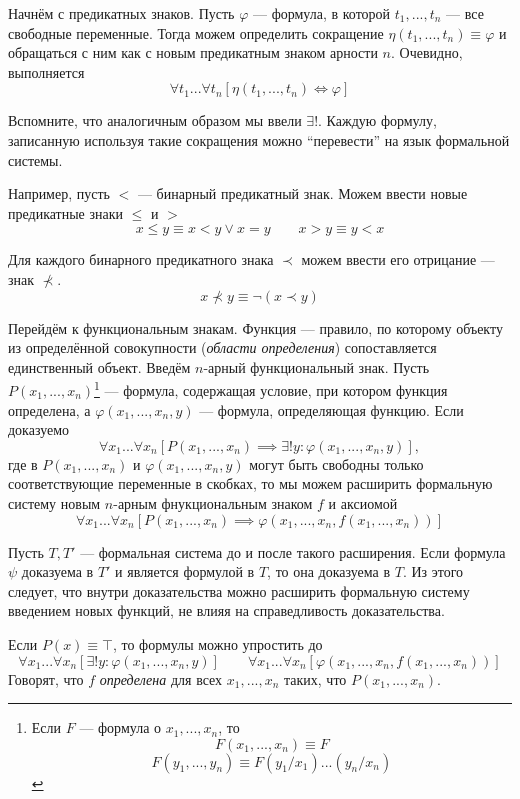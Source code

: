 Начнём с предикатных знаков. Пусть $\varphi$ --- формула,
в которой $t_1,...,t_{n}$ --- все
свободные переменные. Тогда можем определить сокращение $\eta(t_1,...,t_{n})\equiv\varphi$
и обращаться с ним как с новым предикатным знаком арности $n$.
Очевидно, выполняется
\[
	\forall t_1...\forall t_{n}[\eta(t_1,...,t_{n})\iff\varphi]
\]

Вспомните, что аналогичным образом мы ввели $\exists!$. Каждую формулу,
записанную используя такие сокращения можно
``перевести'' на язык формальной системы.

Например, пусть $<$ --- бинарный предикатный знак.
Можем ввести новые предикатные знаки $\leq$ и $>$
\[
	x\leq y\equiv x<y\lor x=y\qquad x>y\equiv y< x
\]

Для каждого бинарного предикатного знака $\prec$ можем
ввести его отрицание --- знак $\nprec$.
\[
	x\nprec y\equiv \lnot(x\prec y)
\]

Перейдём к функциональным знакам. Функция --- правило, по которому объекту
из определённой совокупности ({\it области определения})
сопоставляется единственный объект.
Введём $n$-арный функциональный знак. Пусть $P(x_1,...,x_{n})$\footnote{
Если $F$ --- формула о $x_1,...,x_{n}$, то
\[
	F(x_1,...,x_{n})\equiv F
\]
\[F(y_1,...,y_{n})\equiv F(y_1/x_1)...(y_{n}/x_{n})\]}
--- формула, содержащая
условие, при котором функция определена, а $\varphi(x_1,...,x_{n},y)$ ---
формула, определяющая функцию. Если доказуемо
\[
	\forall x_1...\forall x_n[P(x_1,...,x_{n})
	\implies \exists! y:\varphi(x_1,...,x_{n},y)],
\]
где в $P(x_1,...,x_{n})$ и $\varphi(x_1,...,x_{n},y)$
могут быть свободны только
соответствующие переменные в скобках,
то мы можем расширить формальную систему новым $n$-арным фнукциональным знаком $f$
и аксиомой
\[
	\forall x_1...\forall x_{n}[P(x_1,...,x_{n})
	\implies \varphi(x_1,...,x_{n},f(x_1,...,x_{n}))]
\]

Пусть $T,T'$ --- формальная система до и после такого расширения.
Если формула $\psi$ доказуема в $T'$ и является формулой в $T$, то она доказуема в $T$.
Из этого следует, что внутри доказательства можно расширить формальную систему
введением новых функций, не влияя на справедливость доказательства.

Если $P(x)\equiv \top$, то формулы можно упростить до
\[
	\forall x_1...\forall x_{n}[\exists !y:\varphi(x_1,...,x_{n},y)]\qquad
	\forall x_1...\forall x_{n}[\varphi(x_1,...,x_{n},f(x_1,...,x_{n}))]
\]
Говорят, что $f$ {\it определена}
для всех $x_1,...,x_{n}$ таких, что $P(x_1,...,x_{n})$.

